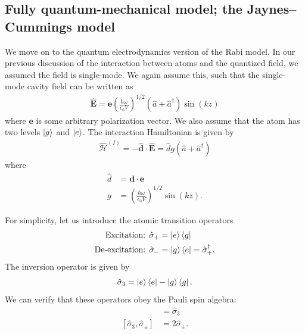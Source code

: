 \documentclass{book}
\theoremstyle{definition}
\newcommand{\ham}{\mathcal{H}}
\newcommand{\f}[2]{\frac{#1}{#2}}
\newcommand{\lp}{\left(}
\newcommand{\rp}{\right)}
\begin{document}
\subsection{Fully quantum-mechanical model; the Jaynes–Cummings model}

We move on to the quantum electrodynamics version of the Rabi model. In our previous discussion of the interaction between atoms and the quantized field, we assumed the field is single-mode. We again assume this, such that the single-mode cavity field can be written as
\begin{align}
\mathbf{\hat{E}} = \mathbf{e}\lp \f{\hbar\omega}{\epsilon_0 V} \rp^{1/2}\lp \hat{a} + \hat{a}^\dagger\rp\sin(kz)
\end{align}
where $\mathbf{e}$ is some arbitrary polarization vector. We also assume that the atom has two levels $\ket{g}$ and $\ket{e}$. The interaction Hamiltonian is given by
\begin{align}
\hat{\ham}^{(I)} = -\mathbf{\hat{d}} \cdot \mathbf{\hat{E}} = \hat{d} g (\hat{a} + \hat{a}^\dagger)
\end{align}
where
\begin{align}
\hat{d} &= \mathbf{d} \cdot \mathbf{e}\\
g &=  \lp \f{\hbar\omega}{\epsilon_0 V} \rp^{1/2}\sin(kz).
\end{align}

For simplicity, let us introduce the atomic transition operators 
\begin{align}
\text{Excitation: } &\hat{\sigma}_+ = \ket{e}\bra{g}\\
\text{De-excitation: } &\hat{\sigma}_- = \ket{g}\bra{e} = \hat{\sigma}_+^\dagger.
\end{align}
The inversion operator is given by
\begin{align}
\hat{\sigma}_3 = \ket{e}\bra{e} - \ket{g}\bra{g}.
\end{align}
We can verify that these operators obey the Pauli spin algebra:
\begin{align}
[\hat{\sigma}_+, \hat{\sigma}_-] &= \hat{\sigma}_3\\
[\hat{\sigma}_3, \hat{\sigma}_\pm] &= 2\hat{\sigma}_\pm.
\end{align}
\end{document}

